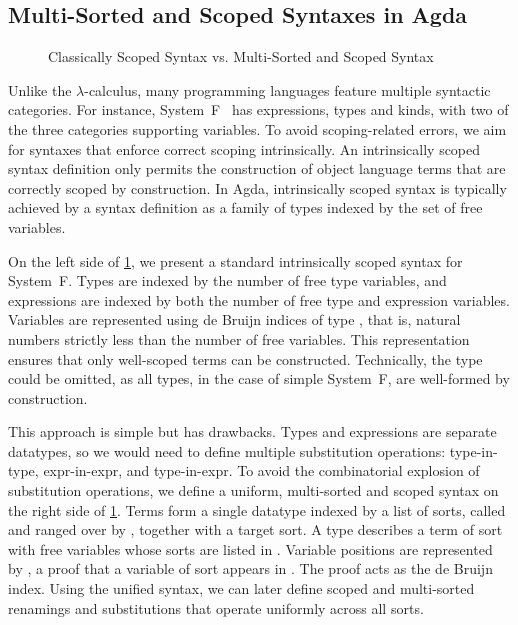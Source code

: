 \documentclass[screen,nonacm]{acmart}
\begin{document}
\subsection{Multi-Sorted and Scoped Syntaxes in Agda}\label{sec:pre-syn}
\begin{figure}[t]
      \centering
      \begin{minipage}[t]{0.48\linewidth}
            \raggedright{}
            \EScoped{}
      \end{minipage}
      \hfill
      \begin{minipage}[t]{0.48\linewidth}
            \raggedright{}
            \EMultiSorted{}
      \end{minipage}
      \caption{Classically Scoped Syntax vs. Multi-Sorted and Scoped Syntax}\label{fig:pre-svm}
\end{figure}

Unlike the $λ$-calculus, many programming languages feature multiple syntactic
categories. For instance, System~F~\cite{girard1972, 10.1007/3-540-06859-7_148}
has expressions, types and kinds, with two of the three categories supporting
variables. To avoid scoping-related errors, we aim for syntaxes that enforce
correct scoping intrinsically. An intrinsically scoped syntax definition only
permits the construction of object language terms that are correctly scoped by
construction. In Agda, intrinsically scoped syntax is typically achieved by a
syntax definition as a family of types indexed by the set of free variables.

On the left side of \cref{fig:pre-svm}, we present a standard intrinsically
scoped syntax for System~F. Types are indexed by the number of free type
variables, and expressions are indexed by both the number of free type and
expression variables. Variables are represented using de Bruijn indices of type
 , that is, natural numbers strictly less than
the number of free variables. This representation ensures that only well-scoped
terms can be constructed. Technically, the  type could be
omitted, as all types, in the case of simple System~F, are well-formed by
construction.

This approach is simple but has drawbacks. Types and expressions are separate
datatypes, so we would need to define multiple substitution operations:
type-in-type, expr-in-expr, and type-in-expr. To avoid the combinatorial
explosion of substitution operations, we define a uniform, multi-sorted and
scoped syntax on the right side of \cref{fig:pre-svm}. Terms form a single
datatype indexed by a list of sorts, called  and ranged
over by , together with a target sort. A type 
  describes a term of sort  with free
variables whose sorts are listed in . Variable positions are
represented by   , a proof that a
variable of sort  appears in . The proof acts as the
de Bruijn index. Using the unified syntax, we can later define scoped and
multi-sorted renamings and substitutions that operate uniformly across all
sorts.
\end{document}
